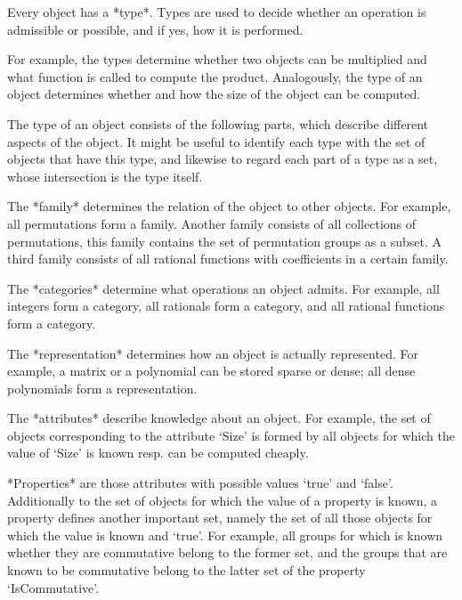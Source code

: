 

Every {\GAP} object has a *type*.
Types are used to decide whether an operation is admissible or possible,
and if yes, how it is performed.

For example, the types determine whether two objects can be multiplied
and what function is called to compute the product.
Analogously, the type of an object determines whether and how the size
of the object can be computed.

The type of an object consists of the following parts,
which describe different aspects of the object.
It might be useful to identify each type with the set of objects that
have this type, and likewise to regard each part of a type as a set,
whose intersection is the type itself.

The *family* determines the relation of the object to other objects.
For example, all permutations form a family.
Another family consists of all collections of permutations,
this family contains the set of permutation groups as a subset.
A third family consists of all rational functions with coefficients
in a certain family.

The *categories* determine what operations an object admits.
For example, all integers form a category, all rationals form a category,
and all rational functions form a category.

The *representation* determines how an object is actually represented.
For example, a matrix or a polynomial can be stored sparse or dense;
all dense polynomials form a representation.

The *attributes* describe knowledge about an object.
For example, the set of objects corresponding to the attribute `Size'
is formed by all objects for which the value of `Size' is known resp.
can be computed cheaply.

*Properties* are those attributes with possible values `true' and
`false'.
Additionally to the set of objects for which the value of a property is
known, a property defines another important set,
namely the set of all those objects for which the value is known and
`true'.
For example, all groups for which is known whether they are commutative
belong to the former set, and the groups that are known to be commutative
belong to the latter set of the property `IsCommutative'.

